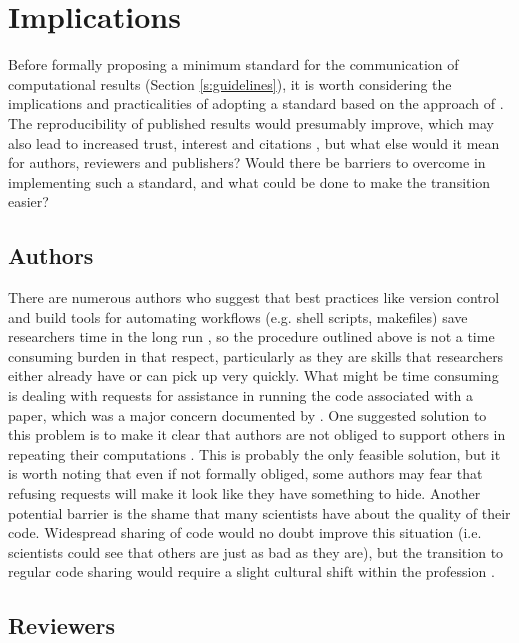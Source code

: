 \section{Implications}

Before formally proposing a minimum standard for the communication of computational results (Section \ref{s:guidelines}), it is worth considering the implications and practicalities of adopting a standard based on the approach of \citet{Irving2015}. The reproducibility of published results would presumably improve, which may also lead to increased trust, interest and citations \citep{Piwowar2007}, but what else would it mean for authors, reviewers and publishers? Would there be barriers to overcome in implementing such a standard, and what could be done to make the transition easier?

\subsection{Authors}

There are numerous authors who suggest that best practices like version control and build tools for automating workflows (e.g. shell scripts, makefiles) save researchers time in the long run \citep[e.g.][]{Sandve2013,Wilson2014a}, so the procedure outlined above is not a time consuming burden in that respect, particularly as they are skills that researchers either already have or can pick up very quickly. What might be time consuming is dealing with requests for assistance in running the code associated with a paper, which was a major concern documented by \citet{Stodden2010}. One suggested solution to this problem is to make it clear that authors are not obliged to support others in repeating their computations \citep{Easterbrook2014}. This is probably the only feasible solution, but it is worth noting that even if not formally obliged, some authors may fear that refusing requests will make it look like they have something to hide. Another potential barrier is the shame that many scientists have about the quality of their code. Widespread sharing of code would no doubt improve this situation (i.e. scientists could see that others are just as bad as they are), but the transition to regular code sharing would require a slight cultural shift within the profession \citep{Barnes2010}.

\subsection{Reviewers}

